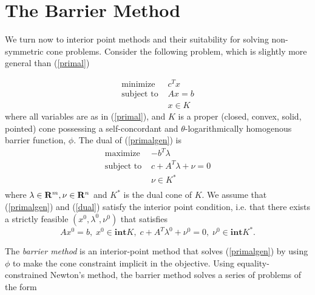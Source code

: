 \documentclass{article}
\begin{document}
\section{The Barrier Method}

We turn now to interior point methods and their suitability for
solving non-symmetric cone problems. Consider the following problem, which is slightly 
more general than (\ref{primal})

\begin{equation}\label{primalgen}
  \begin{array}{ll}
    \mbox{minimize}    & c^Tx \\
    \mbox{subject to } & Ax = b \\
                       & x \in K
  \end{array}
\end{equation}
where all variables are as in (\ref{primal}), and $K$ is a proper (closed, convex, solid, pointed) cone 
possessing a self-concordant and $\theta$-logarithmically homogenous barrier function, $\phi$. The
dual of (\ref{primalgen}) is
\begin{equation}\label{dual}
  \begin{array}{ll}
    \mbox{maximize}    & -b^T\lambda \\
    \mbox{subject to } & c + A^T\lambda + \nu = 0 \\
                       & \nu \in K^* \\
  \end{array}
\end{equation}
where $\lambda\in \mathbf{R}^m, \nu \in \mathbf{R}^n$ and $K^*$ is the dual cone of $K$. We assume
that (\ref{primalgen}) and (\ref{dual}) satisfy the interior point condition, i.e. that there
exists a strictly feasible $(x^0,\lambda^0,\nu^0)$ that satisfies
\[
 Ax^0=b,\; x^0 \in \mathbf{int} K, \; c+ A^T\lambda^0 + \nu^0 = 0,\; \nu^0 \in \mathbf{int} K^*.
\]

The \emph{barrier method} is an interior-point method that solves (\ref{primalgen}) by using
$\phi$ to make the cone constraint implicit in the objective. Using equality-constrained
Newton's method, the barrier method solves a series of problems of the form
\end{document}

